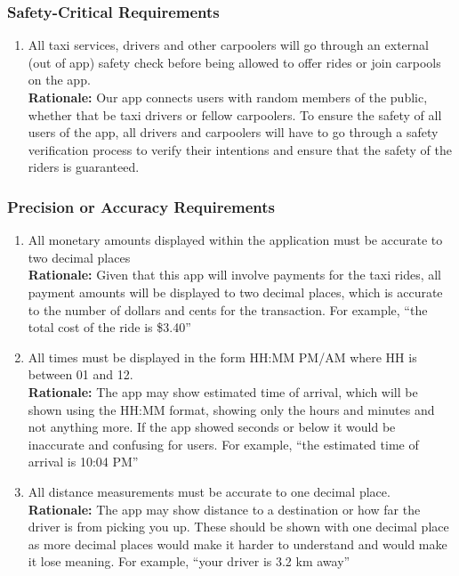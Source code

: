 \documentclass[]{article}
\begin{document}
\subsubsection{Safety-Critical Requirements}
\label{ssub:safety_critical_requirements}
\begin{enumerate}[{PR-SC}1. ]
	\item All taxi services, drivers and other carpoolers will go through an external (out of app) safety check before being allowed to offer rides or join carpools on the app. \\
	{\bf Rationale:} Our app connects users with random members of the public, whether that be taxi drivers or fellow carpoolers. To ensure the safety of all users of the app, all drivers and carpoolers will have to go through a safety verification process to verify their intentions and ensure that the safety of the riders is guaranteed.
\end{enumerate}

\subsubsection{Precision or Accuracy Requirements}
\label{ssub:precision_or_accuracy_requirements}
\begin{enumerate}[{PR-PA}1. ]
	\item All monetary amounts displayed within the application must be accurate to two decimal places \\
	{\bf Rationale:} Given that this app will involve payments for the taxi rides, all payment amounts will be displayed to two decimal places, which is accurate to the number of dollars and cents for the transaction. For example, ``the total cost of the ride is \$3.40'' \\
	\item All times must be displayed in the form HH:MM PM/AM where HH is between 01 and 12. \\
	{\bf Rationale:} The app may show estimated time of arrival, which will be shown using the HH:MM format, showing only the hours and minutes and not anything more. If the app showed seconds or below it would be inaccurate and confusing for users. For example, ``the estimated time of arrival is 10:04 PM'' \\
	\item All distance measurements must be accurate to one decimal place. \\
	{\bf Rationale:} The app may show distance to a destination or how far the driver is from picking you up. These should be shown with one decimal place as more decimal places would make it harder to understand and would make it lose meaning. For example, ``your driver is 3.2 km away''
\end{enumerate}
\end{document}

